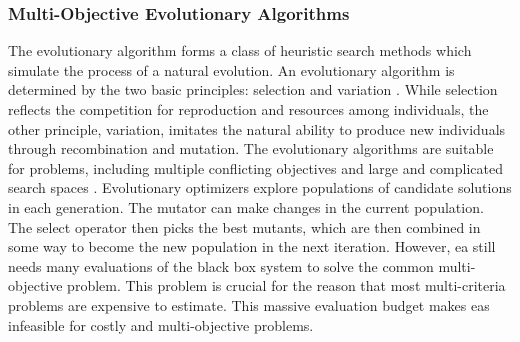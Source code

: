 

            \subsubsection{Multi-Objective Evolutionary Algorithms}
            The evolutionary algorithm forms a class of heuristic search methods which simulate the process of a natural evolution. An evolutionary algorithm is determined by the two basic principles: selection and variation \cite{TutMOEABrockhoff}. While selection reflects the competition for reproduction and resources among individuals, the other principle, variation, imitates the natural ability to produce new individuals through recombination and mutation. 
            The evolutionary algorithms are suitable for problems, including multiple conflicting objectives and large and complicated search spaces \cite{Andersson00asurvey, RamirezRV19}. Evolutionary optimizers explore populations of candidate solutions in each generation. The mutator can make changes in the current population. The select operator then picks the best mutants, which are then combined in some way to become the new population in the next iteration. However, \gls{ea} still needs many evaluations of the black box system to solve the common multi-objective problem. This problem is crucial for the reason that most multi-criteria problems are expensive to estimate. This massive evaluation budget makes \gls{ea}s infeasible for costly and multi-objective problems.  


